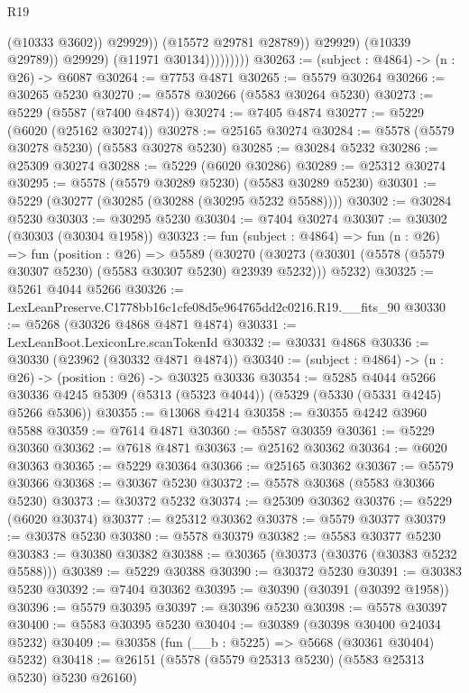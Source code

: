 \begin{lexlean}{R19}
\begin{coremodule}
                                  (@10333 @3602))
                                @29929))
                            (@15572 @29781 @28789))
                          @29929)
                        (@10339 @29789))
                      @29929)
                    (@11971 @30134)))))))))
@30263 := (subject : @4864) -> (n : @26) -> @6087
@30264 := @7753 @4871
@30265 := @5579 @30264
@30266 := @30265 @5230
@30270 := @5578 @30266 (@5583 @30264 @5230)
@30273 := @5229 (@5587 (@7400 @4874))
@30274 := @7405 @4874
@30277 := @5229 (@6020 (@25162 @30274))
@30278 := @25165 @30274
@30284 := @5578 (@5579 @30278 @5230) (@5583 @30278 @5230)
@30285 := @30284 @5232
@30286 := @25309 @30274
@30288 := @5229 (@6020 @30286)
@30289 := @25312 @30274
@30295 := @5578 (@5579 @30289 @5230) (@5583 @30289 @5230)
@30301 := @5229 (@30277 (@30285 (@30288 (@30295 @5232 @5588))))
@30302 := @30284 @5230
@30303 := @30295 @5230
@30304 := @7404 @30274
@30307 := @30302 (@30303 (@30304 @1958))
@30323 := fun (subject : @4864) =>
  fun (n : @26) =>
  fun (position : @26) =>
  @5589
    (@30270 (@30273 (@30301 (@5578 (@5579 @30307 @5230) (@5583 @30307 @5230) @23939 @5232))) @5232)
@30325 := @5261 @4044 @5266
@30326 := LexLeanPreserve.C1778bb16c1cfe08d5e964765dd2c0216.R19.__fits_90
@30330 := @5268 (@30326 @4868 @4871 @4874)
@30331 := LexLeanBoot.LexiconLre.scanTokenId
@30332 := @30331 @4868
@30336 := @30330 (@23962 (@30332 @4871 @4874))
@30340 := (subject : @4864) -> (n : @26) -> (position : @26) -> @30325 @30336
@30354 := @5285
    @4044
    @5266
    @30336
    @4245
    @5309
    (@5313 (@5323 @4044))
    (@5329 (@5330 (@5331 @4245) @5266 @5306))
@30355 := @13068 @4214
@30358 := @30355 @4242 @3960 @5588
@30359 := @7614 @4871
@30360 := @5587 @30359
@30361 := @5229 @30360
@30362 := @7618 @4871
@30363 := @25162 @30362
@30364 := @6020 @30363
@30365 := @5229 @30364
@30366 := @25165 @30362
@30367 := @5579 @30366
@30368 := @30367 @5230
@30372 := @5578 @30368 (@5583 @30366 @5230)
@30373 := @30372 @5232
@30374 := @25309 @30362
@30376 := @5229 (@6020 @30374)
@30377 := @25312 @30362
@30378 := @5579 @30377
@30379 := @30378 @5230
@30380 := @5578 @30379
@30382 := @5583 @30377 @5230
@30383 := @30380 @30382
@30388 := @30365 (@30373 (@30376 (@30383 @5232 @5588)))
@30389 := @5229 @30388
@30390 := @30372 @5230
@30391 := @30383 @5230
@30392 := @7404 @30362
@30395 := @30390 (@30391 (@30392 @1958))
@30396 := @5579 @30395
@30397 := @30396 @5230
@30398 := @5578 @30397
@30400 := @5583 @30395 @5230
@30404 := @30389 (@30398 @30400 @24034 @5232)
@30409 := @30358 (fun (__b : @5225) => @5668 (@30361 @30404) @5232)
@30418 := @26151 (@5578 (@5579 @25313 @5230) (@5583 @25313 @5230) @5230 @26160)

\end{coremodule}
\end{lexlean}
